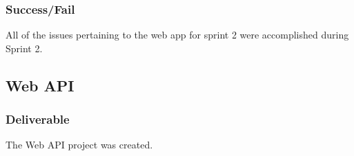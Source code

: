 

\subsubsection{Success/Fail}
All of the issues pertaining to the web app for sprint 2 were accomplished during Sprint 2.

\subsection{Web API}
\subsubsection{Deliverable}
The Web API project was created.
